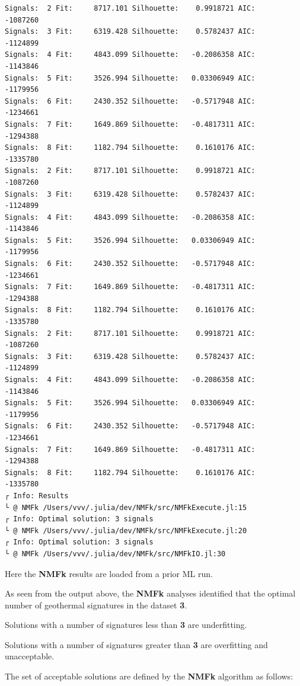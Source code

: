 \documentclass[11pt]{article}
\begin{document}
    \begin{Verbatim}[commandchars=\\\{\}]
Signals:  2 Fit:     8717.101 Silhouette:    0.9918721 AIC:     -1087260
Signals:  3 Fit:     6319.428 Silhouette:    0.5782437 AIC:     -1124899
Signals:  4 Fit:     4843.099 Silhouette:   -0.2086358 AIC:     -1143846
Signals:  5 Fit:     3526.994 Silhouette:   0.03306949 AIC:     -1179956
Signals:  6 Fit:     2430.352 Silhouette:   -0.5717948 AIC:     -1234661
Signals:  7 Fit:     1649.869 Silhouette:   -0.4817311 AIC:     -1294388
Signals:  8 Fit:     1182.794 Silhouette:    0.1610176 AIC:     -1335780
Signals:  2 Fit:     8717.101 Silhouette:    0.9918721 AIC:     -1087260
Signals:  3 Fit:     6319.428 Silhouette:    0.5782437 AIC:     -1124899
Signals:  4 Fit:     4843.099 Silhouette:   -0.2086358 AIC:     -1143846
Signals:  5 Fit:     3526.994 Silhouette:   0.03306949 AIC:     -1179956
Signals:  6 Fit:     2430.352 Silhouette:   -0.5717948 AIC:     -1234661
Signals:  7 Fit:     1649.869 Silhouette:   -0.4817311 AIC:     -1294388
Signals:  8 Fit:     1182.794 Silhouette:    0.1610176 AIC:     -1335780
Signals:  2 Fit:     8717.101 Silhouette:    0.9918721 AIC:     -1087260
Signals:  3 Fit:     6319.428 Silhouette:    0.5782437 AIC:     -1124899
Signals:  4 Fit:     4843.099 Silhouette:   -0.2086358 AIC:     -1143846
Signals:  5 Fit:     3526.994 Silhouette:   0.03306949 AIC:     -1179956
Signals:  6 Fit:     2430.352 Silhouette:   -0.5717948 AIC:     -1234661
Signals:  7 Fit:     1649.869 Silhouette:   -0.4817311 AIC:     -1294388
Signals:  8 Fit:     1182.794 Silhouette:    0.1610176 AIC:     -1335780
┌ Info: Results
└ @ NMFk /Users/vvv/.julia/dev/NMFk/src/NMFkExecute.jl:15
┌ Info: Optimal solution: 3 signals
└ @ NMFk /Users/vvv/.julia/dev/NMFk/src/NMFkExecute.jl:20
┌ Info: Optimal solution: 3 signals
└ @ NMFk /Users/vvv/.julia/dev/NMFk/src/NMFkIO.jl:30
    \end{Verbatim}

    Here the \textbf{NMFk} results are loaded from a prior ML run.

As seen from the output above, the \textbf{NMFk} analyses identified
that the optimal number of geothermal signatures in the dataset
\textbf{3}.

Solutions with a number of signatures less than \textbf{3} are
underfitting.

Solutions with a number of signatures greater than \textbf{3} are
overfitting and unacceptable.

The set of acceptable solutions are defined by the \textbf{NMFk}
algorithm as follows:
\end{document}
